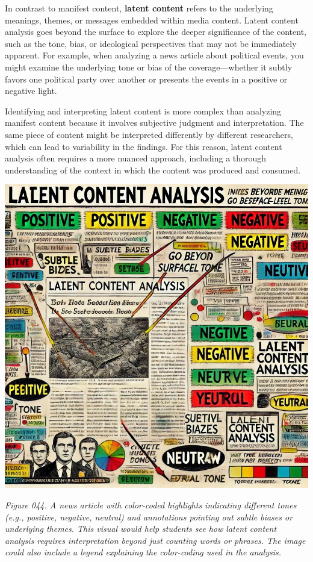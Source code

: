 \documentclass[
]{book}
\begin{document}
In contrast to manifest content, \textbf{latent content} refers to the underlying meanings, themes, or messages embedded within media content. Latent content analysis goes beyond the surface to explore the deeper significance of the content, such as the tone, bias, or ideological perspectives that may not be immediately apparent. For example, when analyzing a news article about political events, you might examine the underlying tone or bias of the coverage---whether it subtly favors one political party over another or presents the events in a positive or negative light.

Identifying and interpreting latent content is more complex than analyzing manifest content because it involves subjective judgment and interpretation. The same piece of content might be interpreted differently by different researchers, which can lead to variability in the findings. For this reason, latent content analysis often requires a more nuanced approach, including a thorough understanding of the context in which the content was produced and consumed.

\includegraphics[width=1\textwidth,height=\textheight]{images/fig044.jpg}

\emph{Figure 044. A news article with color-coded highlights indicating different tones (e.g., positive, negative, neutral) and annotations pointing out subtle biases or underlying themes. This visual would help students see how latent content analysis requires interpretation beyond just counting words or phrases. The image could also include a legend explaining the color-coding used in the analysis.}
\end{document}
